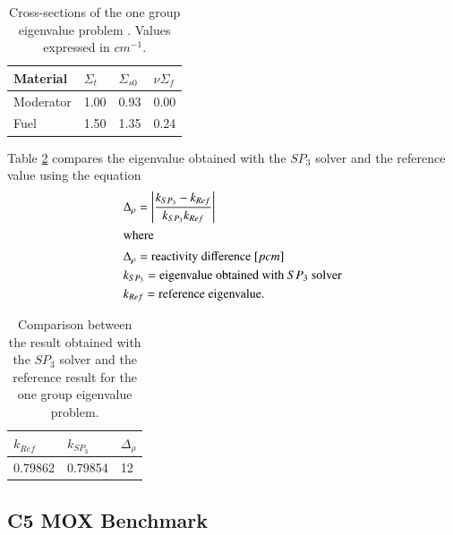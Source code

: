 \documentclass{anstrans}
\begin{document}
\begin{table}[h]
	\centering
	\caption{Cross-sections of the one group eigenvalue problem \cite{brantley_simplifiedP3_2000}. Values expressed in $cm^{-1}$.}
	\label{tab:cross-sections}
	\begin{tabular}{llll}
	\toprule
	Material	& $\Sigma_t$ & $\Sigma_{s0}$ & $\nu\Sigma_f$ \\
	\midrule
	Moderator	& 1.00		& 0.93			& 0.00			\\
	Fuel		& 1.50		& 1.35			& 0.24			\\
	\bottomrule
	\end{tabular}
\end{table}

Table \ref{tab:keff-1st} compares the eigenvalue obtained with the $SP_3$ solver and the reference value \cite{brantley_simplifiedP3_2000} using the equation
\begin{align}
  & \Delta_\rho = \left| \frac{k_{SP_3}-k_{Ref}}{k_{SP_3} k_{Ref}} \right| \label{eq:delta-rho} \\
  \intertext{where}
  & \Delta_\rho = \mbox{reactivity difference } [pcm] \notag \\
  & k_{SP_3} = \mbox{eigenvalue obtained with $SP_3$ solver} \notag \\
  & k_{Ref} = \mbox{reference eigenvalue.} \notag
\end{align}

\begin{table}[htbp!]
	\centering
	\caption{Comparison between the result obtained with the $SP_3$ solver and the reference result for the one group eigenvalue problem.}
	\label{tab:keff-1st}
	\begin{tabular}{lll}
	\toprule
		$k_{Ref}$	& $k_{SP_3}$ 	& $\Delta_{\rho}$	\\
	\midrule
	 	0.79862		& 0.79854		& 12				\\
	\bottomrule
	\end{tabular}
\end{table}


\subsection{C5 MOX Benchmark}
\end{document}
